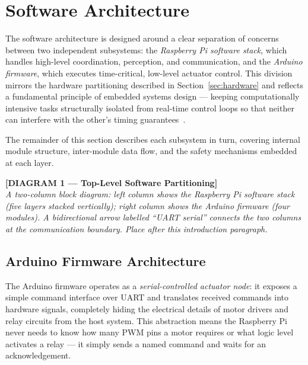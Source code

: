 \section{Software Architecture}
\label{sec:software}
 
The software architecture is designed around a clear separation of
concerns between two independent subsystems: the \emph{Raspberry Pi
software stack}, which handles high-level coordination, perception,
and communication, and the \emph{Arduino firmware}, which executes
time-critical, low-level actuator control. This division mirrors the
hardware partitioning described in Section~\ref{sec:hardware} and
reflects a fundamental principle of embedded systems design — keeping
computationally intensive tasks structurally isolated from real-time
control loops so that neither can interfere with the other's timing
guarantees~\cite{heath2002embedded}.
 
The remainder of this section describes each subsystem in turn,
covering internal module structure, inter-module data flow, and the
safety mechanisms embedded at each layer.
 
\bigskip
\noindent\textbf{[DIAGRAM 1 — Top-Level Software Partitioning]}\\
\textit{A two-column block diagram: left column shows the Raspberry Pi
software stack (five layers stacked vertically); right column shows the
Arduino firmware (four modules). A bidirectional arrow labelled
``UART serial'' connects the two columns at the communication boundary.
Place after this introduction paragraph.}
\bigskip
 
\subsection{Arduino Firmware Architecture}
 
The Arduino firmware operates as a \emph{serial-controlled actuator
node}: it exposes a simple command interface over UART and translates
received commands into hardware signals, completely hiding the
electrical details of motor drivers and relay circuits from the host
system. This abstraction means the Raspberry Pi never needs to know
how many PWM pins a motor requires or what logic level activates a
relay — it simply sends a named command and waits for an
acknowledgement.
 
